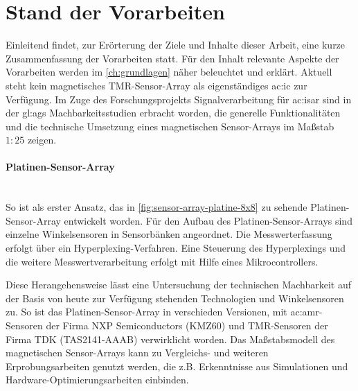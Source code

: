 %

\section{Stand der Vorarbeiten}\label{sec:stand-der-vorarbeiten}

Einleitend findet, zur Erörterung der Ziele und Inhalte dieser Arbeit, eine kurze Zusammenfassung der Vorarbeiten statt.
Für den Inhalt relevante Aspekte der Vorarbeiten werden im \autoref{ch:grundlagen} näher beleuchtet und erklärt.
\newline
Aktuell steht kein magnetisches TMR-Sensor-Array als eigenständiges \gls{ac:ic} zur Verfügung. Im Zuge des Forschungsprojekts Signalverarbeitung für \gls{ac:isar} sind in der \gls{gl:ags} Machbarkeitsstudien \cite{Mehm2019}\cite{Ernsting2020} erbracht worden, die generelle Funktionalitäten und die technische Umsetzung eines magnetischen Sensor-Arrays im Maßstab $1:25$ zeigen.


\paragraph{Platinen-Sensor-Array}\label{par:platinen-sensor-array}$~$\\


So ist als erster Ansatz, das in \autoref{fig:sensor-array-platine-8x8} zu sehende Platinen-Sensor-Array entwickelt worden. Für den Aufbau des Platinen-Sensor-Arrays sind einzelne Winkelsensoren in Sensorbänken angeordnet. Die Messwerterfassung erfolgt über ein Hyperplexing-Verfahren.
Eine Steuerung des Hyperplexings und die weitere Messwertverarbeitung erfolgt mit Hilfe eines Mikrocontrollers.

Diese Herangehensweise lässt eine Untersuchung der technischen Machbarkeit auf der Basis von heute zur Verfügung 
stehenden Technologien und Winkelsensoren zu.
So ist das Platinen-Sensor-Array in verschieden Versionen, mit \gls{ac:amr}-Sensoren der Firma NXP Semiconductors 
(KMZ60) \cite{NXPSemiconductors2014} und TMR-Sensoren der Firma TDK (TAS2141-AAAB) \cite{TDK2016} verwirklicht worden. 
Das Maßstabsmodell des magnetischen Sensor-Arrays kann zu Vergleichs- und weiteren Erprobungsarbeiten genutzt werden, 
die z.B. Erkenntnisse aus Simulationen und Hardware-Optimierungsarbeiten einbinden.


\clearpage



